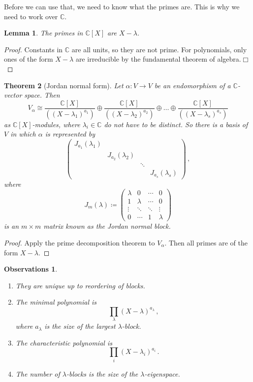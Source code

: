 \documentclass{article}
\theoremstyle{plain}\theoremheaderfont{\normalfont\itshape}\theorembodyfont{\rmfamily}\theoremseparator{.}\newtheorem*{rem}{Remark}\newtheorem*{ex}{Example}\newtheorem*{proof}{Proof}\newtheorem*{altp}{Alternative proof}\newtheorem*{nonex}{Non-Example}
\theoremstyle{plain}\theoremheaderfont{\normalfont\bfseries}\theorembodyfont{\rmfamily}\theoremseparator{.}\newtheorem{thm}{Theorem}[section]\newtheorem{lem}[thm]{Lemma}\newtheorem{prop}[thm]{Proposition}\newtheorem*{cor}{Corollary}\newtheorem{defn}[thm]{Definition}\newtheorem{clm}[thm]{Claim}\newtheorem{clminproof}{Claim}\newtheorem*{notn}{Notation}\newtheorem*{exer}{Exercise}\newtheorem*{lemnn}{Lemma}
\theoremstyle{break}\theoremheaderfont{\normalfont\itshape}\theorembodyfont{\rmfamily}\theoremseparator{.\medskip}\newtheorem*{proofskip}{Proof}\newtheorem*{exs}{Examples}\newtheorem*{rems}{Remarks}\newtheorem*{obs}{Observations}
\theoremstyle{break}\theoremheaderfont{\normalfont\bfseries}\theorembodyfont{\rmfamily}\theoremseparator{.\medskip}\newtheorem{lemskip}[thm]{Lemma}\newtheorem{defnskip}[thm]{Definition}\newtheorem{propskip}[thm]{Proposition}\newtheorem{thmskip}[thm]{Theorem}
\numberwithin{equation}{section}
\newcommand{\qed}{\hfill\ensuremath{\Box}}
\newcommand{\CC}{\mathbb{C}}
\begin{document}
    Before we can use that, we need to know what the primes are. This is why we need to work over \(\CC\).
    \begin{lem}
        The primes in \(\CC[X]\) are \(X-\lambda\).
    \end{lem}
    \begin{proof}
        Constants in \(\CC\) are all units, so they are not prime. For polynomials, only ones of the form \(X-\lambda\) are irreducible by the fundamental theorem of algebra.\qed
    \end{proof}
    \begin{thm}[Jordan normal form]
        Let \(\alpha:V\to V\) be an endomorphism of a \(\CC\)-vector space. Then
        \[V_\alpha\cong\frac{\CC[X]}{((X-\lambda_1)^{a_1})}\oplus\frac{\CC[X]}{((X-\lambda_2)^{a_2})}\oplus\dots\oplus\frac{\CC[X]}{((X-\lambda_s)^{a_s})}\]
        as \(\CC[X]\)-modules, where \(\lambda_i\in\CC\) do not have to be distinct. So there is a basis of \(V\) in which \(\alpha\) is represented by
        \[\begin{pmatrix}
            J_{a_1}(\lambda_1) \\
            ~ & J_{a_2}(\lambda_2)\\
            ~ & ~ & \ddots \\
            ~ & ~ & ~ & J_{a_s}(\lambda_s)
        \end{pmatrix}\,,\]
        where
        \[J_m(\lambda)\coloneqq\begin{pmatrix}
            \lambda & 0 & \cdots & 0\\
            1 & \lambda & \cdots & 0 \\
            \vdots & \ddots & \ddots & \vdots \\
            0 & \cdots & 1 & \lambda
        \end{pmatrix}\]
        is an \(m\times m\) matrix known as the \textit{Jordan normal block}.
    \end{thm}
    \begin{proof}
        Apply the prime decomposition theorem to \(V_\alpha\). Then all primes are of the form \(X-\lambda\).
    \end{proof}
    \begin{obs}
        \begin{enumerate}[topsep=0pt,label=(\roman*)]
            \item They are unique up to reordering of blocks.
            \item The minimal polynomial is
            \[\prod_{\lambda}(X-\lambda)^{a_\lambda}\,,\]
            where \(a_\lambda\) is the size of the largest \(\lambda\)-block.
            \item The characteristic polynomial is
            \[\prod_{i}(X-\lambda_i)^{a_i}\,.\]
            \item The number of \(\lambda\)-blocks is the size of the \(\lambda\)-eigenspace.
        \end{enumerate}
    \end{obs}
\end{document}
